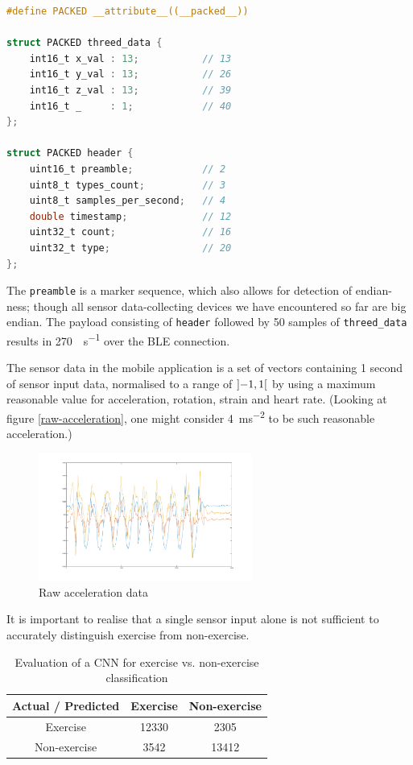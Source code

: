 \documentclass[a4paper, 10 pt, conference]{IEEEtran}
\begin{document}
\begin{lstlisting}[language=C,caption={BLE 3-axis data},label={lst:threed-data}]
#define PACKED __attribute__((__packed__))

struct PACKED threed_data {
    int16_t x_val : 13;           // 13
    int16_t y_val : 13;           // 26
    int16_t z_val : 13;           // 39
    int16_t _     : 1;            // 40
};

struct PACKED header {
    uint16_t preamble;            // 2
    uint8_t types_count;          // 3
    uint8_t samples_per_second;   // 4
    double timestamp;             // 12
    uint32_t count;               // 16
    uint32_t type;                // 20
};
\end{lstlisting}

The \lstinline{preamble} is a marker sequence, which also allows for detection of endian-ness; though all sensor data-collecting devices we have encountered so far are big endian. The payload consisting of \lstinline{header} followed by 50 samples of \lstinline{threed_data} results in \SI{270}{\byte\per\second} over the BLE connection. 

The sensor data in the mobile application is a set of vectors containing 1 second of sensor input data, normalised to a range of $\interval[open]{-1}{1}$ by using a maximum reasonable value for acceleration, rotation, strain and heart rate. (Looking at figure \autoref{raw-acceleration}, one might consider \SI{4}{ms^{-2}} to be such reasonable acceleration.) 

\begin{figure}[hp]
	\begin{center}
		\caption{Raw acceleration data}
		\label{raw-acceleration}
		\includegraphics[width=7cm,keepaspectratio]{ri-raw-acceleration.png}
	\end{center}
\end{figure}


It is important to realise that a single sensor input alone is not sufficient to accurately distinguish exercise from non-exercise. 

\begin{table}[h]
\caption{Evaluation of a CNN for exercise vs. non-exercise classification}
\label{exercise}
\begin{center}
\begin{tabular}{|c||c||c|}
\hline
Actual / Predicted & Exercise & Non-exercise\\
\hline
Exercise & 12330 & 2305\\
\hline
Non-exercise & 3542 & 13412\\
\hline
\end{tabular}
\end{center}
\end{table}
\end{document}
